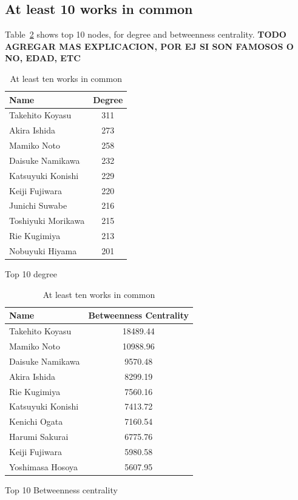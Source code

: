 \subsection{At least 10 works in common}
Table~\ref{tab:top10atLeast10Works} shows top 10 nodes, for degree and betweenness centrality. \textbf{TODO AGREGAR MAS EXPLICACION, POR EJ SI SON FAMOSOS O NO, EDAD, ETC}

\begin{table}[!htb]
    \begin{minipage}{.5\textwidth}
        \centering
            \begin{tabular}{|l|c|}
				\hline
				Name & Degree \\
				\hline
				Takehito Koyasu & 311 \\
				\hline
				Akira Ishida & 273 \\
				\hline
				Mamiko Noto & 258 \\
				\hline
				Daisuke Namikawa & 232 \\
				\hline
				Katsuyuki Konishi & 229 \\
				\hline
				Keiji Fujiwara & 220 \\
				\hline
				Junichi Suwabe & 216 \\
				\hline
				Toshiyuki Morikawa & 215 \\
				\hline
				Rie Kugimiya & 213 \\
				\hline
				Nobuyuki Hiyama & 201 \\
				\hline
			\end{tabular}
            \caption{Top 10 degree}
    \end{minipage}%
    \begin{minipage}{.6\textwidth}
        \centering
        \begin{tabular}{|l|c|}
				\hline
				Name & Betweenness Centrality \\
				\hline
				Takehito Koyasu & 18489.44 \\
				\hline
				Mamiko Noto & 10988.96 \\
				\hline
				Daisuke Namikawa & 9570.48 \\
				\hline
				Akira Ishida & 8299.19 \\
				\hline
				Rie Kugimiya & 7560.16 \\
				\hline
				Katsuyuki Konishi & 7413.72 \\
				\hline
				Kenichi Ogata & 7160.54 \\
				\hline
				Harumi Sakurai & 6775.76 \\
				\hline
				Keiji Fujiwara & 5980.58 \\
				\hline
				Yoshimasa Hosoya & 5607.95 \\
				\hline
		\end{tabular}
        \caption{Top 10 Betweenness centrality }
    \end{minipage}
    \caption{At least ten works in common}
    \label{tab:top10atLeast10Works}
\end{table}

